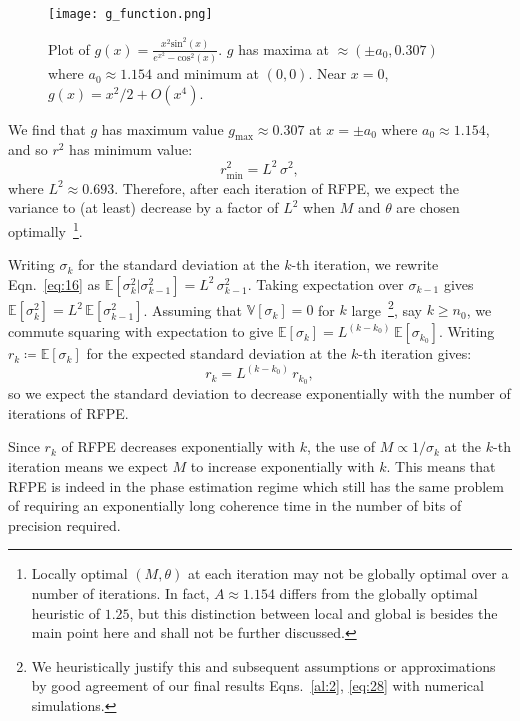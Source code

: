 \documentclass[twocolumn,
 reprint,
 amsmath,amssymb,
 aps,
 floatfix,
superscriptaddress
]{revtex4-1}
\begin{document}
\begin{figure}
\texttt{[image: g\_function.png]}
\centering{}\caption{{\scriptsize{}Plot of $g(x)=\frac{x^{2}\text{sin}^{2}(x)}{e^{x^{2}}-\text{cos}^{2}(x)}$.
$g$ has maxima at $\approx(\pm a_{0},0.307)$ where $a_0\approx 1.154$ and minimum
at $(0,0)$. Near $x=0$, $g(x)=x^{2}/2+O(x^{4})$. }}
\label{g plot}
\end{figure}

We find that $g$ has maximum value $g_{\text{max}}\approx0.307$ at $x=\pm a_0$ where $a_0\approx1.154$, and so $r^{2}$ has
minimum value:
\begin{equation}\label{eq:16}
r_{\text{min}}^{2}=L^{2}\,\sigma^{2},
\end{equation}
where $L^2\approx0.693$. Therefore, after each iteration
of RFPE, we expect the variance to (at least) decrease by a factor
of $L^2$ when $M$ and $\theta$ are chosen optimally~\footnote{Locally optimal $(M,\theta)$ at each
iteration may not be globally optimal over a number of iterations. In fact, $A\approx1.154$ differs from the globally optimal heuristic of $1.25$, but this distinction between local
and global is besides the main point here
and shall not be further discussed.}.

Writing $\sigma_{k}$ for the standard deviation at the $k$-th iteration,
we rewrite Eqn.~\ref{eq:16} as $\mathbb{E}[\sigma_{k}^{2}|\sigma_{k-1}^{2}]=L^{2}\,\sigma_{k-1}^{2}.$
Taking expectation over $\sigma_{k-1}$ gives
$\mathbb{E}[\sigma_{k}^{2}]=L^{2}\,\mathbb{E}[\sigma_{k-1}^{2}]$. Assuming that $\mathbb{V}[\sigma_{k}]=0$ for $k$ large~\footnote{We heuristically justify this and subsequent assumptions or approximations
by good agreement of our final results Eqns.~\ref{al:2}, \ref{eq:28} with
numerical simulations.}, say $k\geq n_0$, we commute squaring with expectation to give
$\mathbb{E}[\sigma_{k}]=L^{(k-k_{0})}\,\mathbb{E}[\sigma_{k_{0}}].$
Writing $r_{k}\coloneqq\mathbb{E}[\sigma_{k}]$ for the expected standard
deviation at the $k$-th iteration gives:
\begin{equation}\label{eq:17}
r_{k}=L^{(k-k_{0})}\,r_{k_{0}},
\end{equation}
so we expect the standard deviation to decrease exponentially with
the number of iterations of RFPE.

Since $r_{k}$ of RFPE decreases exponentially with $k$, the use
of $M\propto1/\sigma_{k}$ at the $k$-th iteration means we expect
$M$ to increase exponentially with $k$. This means that RFPE is
indeed in the phase estimation regime which still has the same problem
of requiring an exponentially long coherence time in the number of
bits of precision required. 
\end{document}
